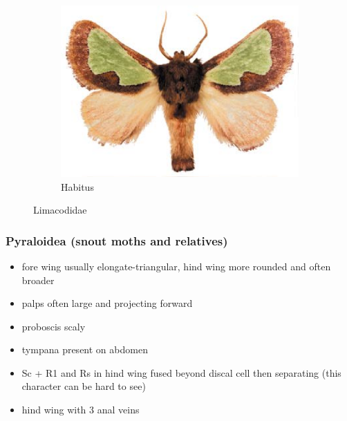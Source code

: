 \documentclass[letterpaper, 11pt]{article}
\begin{document}
\begin{figure}[ht!]
\begin{subfigure}[ht!]{0.48\textwidth}
        \includegraphics[width=\textwidth]{image47}
        \caption{Habitus}
        \label{fig:limacodid2}
    \end{subfigure}
    \caption{Limacodidae}\label{fig:limacodids}
\end{figure}

\subsubsection{Pyraloidea (snout moths and relatives)}
\begin{itemize}
\item fore wing usually elongate-triangular, hind wing more rounded and often broader
\item palps often large and projecting forward
\item proboscis scaly
\item tympana present on abdomen
\item Sc + R1 and Rs in hind wing fused beyond discal cell then separating (this character can be hard to see)
\item hind wing with 3 anal veins
\end{itemize}
\end{document}
